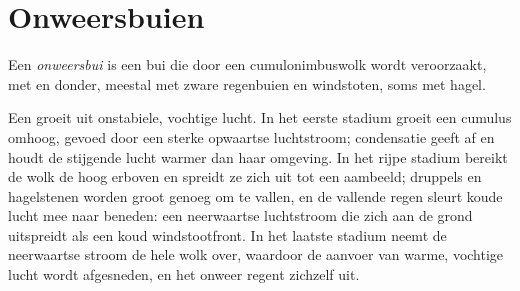 \section{Onweersbuien}

\begin{definition}[Onweersbui]\label{def:g10:storms-and-cyclones:thunderstorm}
Een \emph{onweersbui} is een bui die door een
cumulonimbuswolk wordt veroorzaakt, met  en donder, meestal met zware
regenbuien en windstoten, soms met hagel.
\end{definition}

Een  groeit uit onstabiele, vochtige lucht. In het eerste stadium
groeit een cumulus omhoog, gevoed door een sterke opwaartse luchtstroom;
condensatie geeft  af en houdt de stijgende lucht warmer dan haar
omgeving. In het rijpe stadium bereikt de wolk de  hoog erboven en
spreidt ze zich uit tot een aambeeld; druppels en hagelstenen worden groot genoeg
om te vallen, en de vallende regen sleurt koude lucht mee naar beneden: een
neerwaartse luchtstroom die zich aan de grond uitspreidt als een koud
windstootfront. In het laatste stadium neemt de neerwaartse stroom de hele wolk
over, waardoor de aanvoer van warme, vochtige lucht wordt afgesneden, en het
onweer regent zichzelf uit.

